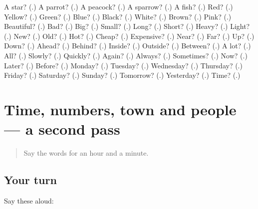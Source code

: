 \begin{tcolorbox}[breakable,colback=teal!4,colframe=teal!35!black,title={Before you move on}]
A star? (\textbf{}.) A parrot? (\textbf{}.) A peacock? (\textbf{}.) A sparrow? (\textbf{}.) A fish? (\textbf{}.) Red? (\textbf{}.) Yellow? (\textbf{}.) Green? (\textbf{}.) Blue? (\textbf{}.) Black? (\textbf{}.) White? (\textbf{}.) Brown? (\textbf{}.) Pink? (\textbf{}.) Beautiful? (\textbf{}.) Bad? (\textbf{}.) Big? (\textbf{}.) Small? (\textbf{}.) Long? (\textbf{}.) Short? (\textbf{}.) Heavy? (\textbf{}.) Light? (\textbf{}.) New? (\textbf{}.) Old? (\textbf{}.) Hot? (\textbf{}.) Cheap? (\textbf{}.) Expensive? (\textbf{}.) Near? (\textbf{}.) Far? (\textbf{}.) Up? (\textbf{}.) Down? (\textbf{}.) Ahead? (\textbf{}.) Behind? (\textbf{}.) Inside? (\textbf{}.) Outside? (\textbf{}.) Between? (\textbf{}.) A lot? (\textbf{}.) All? (\textbf{}.) Slowly? (\textbf{}.) Quickly? (\textbf{}.) Again? (\textbf{}.) Always? (\textbf{}.) Sometimes? (\textbf{}.) Now? (\textbf{}.) Later? (\textbf{}.) Before? (\textbf{}.) Monday? (\textbf{}.) Tuesday? (\textbf{}.) Wednesday? (\textbf{}.) Thursday? (\textbf{}.) Friday? (\textbf{}.) Saturday? (\textbf{}.) Sunday? (\textbf{}.) Tomorrow? (\textbf{}.) Yesterday? (\textbf{}.) Time? (\textbf{}.)
\end{tcolorbox}
\section[(dialogue)]{Time, numbers, town and people — a second pass}

\label{lesson:GU-R91-second-pass-time-numbers-town-and-people}



\begin{quote}
Say the words for an hour and a minute.
\end{quote}

\subsection*{Your turn}
Say these aloud:

